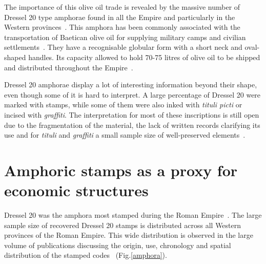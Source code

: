The importance of this olive oil trade is revealed by the massive number of Dressel 20 type amphorae found in all the Empire and particularly in the Western provinces~\citep{dressel_ricerche_1878,millet_anforas_1998}. This amphora has been commonly associated with the transportation of Baetican olive oil for supplying military camps and civilian settlements~\citep{berni_millet_epigrafianforica_2008}. They have a recognisable globular form with a short neck and oval-shaped handles. Its capacity allowed to hold 70-75 litres of olive oil to be shipped and distributed throughout the Empire~\citep{berni_dressel_2016}.

Dressel 20 amphorae display a lot of interesting information beyond their shape, even though some of it is hard to interpret. A large percentage of Dressel 20 were marked with stamps, while some of them were also inked with \textit{tituli picti} or incised with \textit{graffiti}. The interpretation for most of these inscriptions is still open due to the fragmentation of the material, the lack of written records clarifying its use and for \textit{tituli} and \textit{graffiti} a small sample size of well-preserved elements~\citep{aguilera_evolucion_2007,rovira_guardiola_grafitos_2007}. 

\section{Amphoric stamps as a proxy for economic structures}
\label{sec:2}

Dressel 20 was the amphora most stamped during the Roman Empire~\citep[18]{millet_anforas_1998}. The large sample size of recovered Dressel 20 stamps is distributed across all Western provinces of the Roman Empire. This wide distribution is observed in the large volume of publications discussing the origin, use, chronology and spatial distribution of the stamped codes~\citep{dressel_ricerche_1878,rodriguez_economioleicola_1977,chicepi1985,millet_anforas_1998, remesal_sellar_2016} (Fig.\ref{amphora}).

